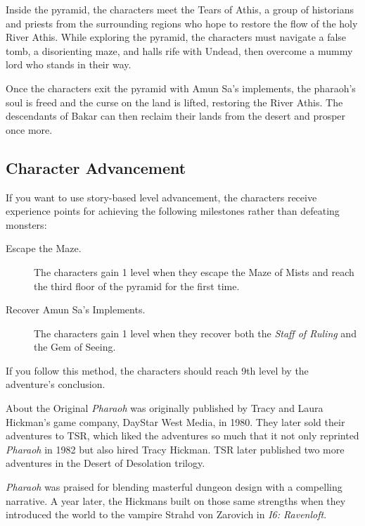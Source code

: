 \documentclass[10pt,a4paper,twoside,bg=print,twocolumn,openany,nodeprecatedcode]{dndbook}
\begin{document}
Inside the pyramid, the characters meet the Tears of Athis, a group of historians and priests from the surrounding regions who hope to restore the flow of the holy River Athis. While exploring the pyramid, the characters must navigate a false tomb, a disorienting maze, and halls rife with Undead, then overcome a mummy lord who stands in their way.

Once the characters exit the pyramid with Amun Sa's implements, the pharaoh's soul is freed and the curse on the land is lifted, restoring the River Athis. The descendants of Bakar can then reclaim their lands from the desert and prosper once more.

\subsection{Character Advancement}
If you want to use story-based level advancement, the characters receive experience points for achieving the following milestones rather than defeating monsters:


\begin{description}
\item[Escape the Maze.]
The characters gain 1 level when they escape the Maze of Mists and reach the third floor of the pyramid for the first time.
\item[Recover Amun Sa's Implements.]
The characters gain 1 level when they recover both the \textit{Staff of Ruling} and the Gem of Seeing.
\end{description}

If you follow this method, the characters should reach 9th level by the adventure's conclusion.

\begin{DndReadAloud}{About the Original}
\textit{Pharaoh} was originally published by Tracy and Laura Hickman's game company, DayStar West Media, in 1980. They later sold their adventures to TSR, which liked the adventures so much that it not only reprinted \textit{Pharaoh} in 1982 but also hired Tracy Hickman. TSR later published two more adventures in the Desert of Desolation trilogy.

\textit{Pharaoh} was praised for blending masterful dungeon design with a compelling narrative. A year later, the Hickmans built on those same strengths when they introduced the world to the vampire Strahd von Zarovich in \textit{I6: Ravenloft}.

\end{DndReadAloud}
\end{document}
